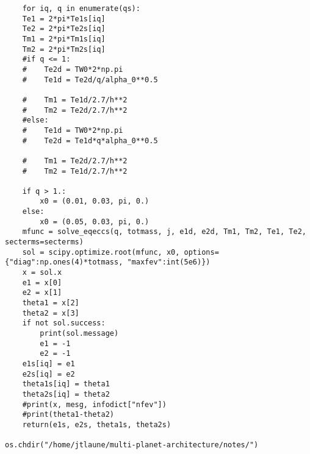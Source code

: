 \documentclass[11pt]{article}
\begin{document}
\begin{verbatim}
    for iq, q in enumerate(qs):
	Te1 = 2*pi*Te1s[iq]
	Te2 = 2*pi*Te2s[iq]
	Tm1 = 2*pi*Tm1s[iq]
	Tm2 = 2*pi*Tm2s[iq]
	#if q <= 1:
	#    Te2d = TW0*2*np.pi
	#    Te1d = Te2d/q/alpha_0**0.5

	#    Tm1 = Te1d/2.7/h**2
	#    Tm2 = Te2d/2.7/h**2
	#else:
	#    Te1d = TW0*2*np.pi
	#    Te2d = Te1d*q*alpha_0**0.5

	#    Tm1 = Te2d/2.7/h**2
	#    Tm2 = Te1d/2.7/h**2

	if q > 1.:
	    x0 = (0.01, 0.03, pi, 0.)
	else:
	    x0 = (0.05, 0.03, pi, 0.)
	mfunc = solve_eqeccs(q, totmass, j, e1d, e2d, Tm1, Tm2, Te1, Te2, secterms=secterms)
	sol = scipy.optimize.root(mfunc, x0, options={"diag":np.ones(4)*totmass, "maxfev":int(5e6)})
	x = sol.x
	e1 = x[0]
	e2 = x[1]
	theta1 = x[2]
	theta2 = x[3]
	if not sol.success:
	    print(sol.message)
	    e1 = -1
	    e2 = -1
	e1s[iq] = e1
	e2s[iq] = e2
	theta1s[iq] = theta1
	theta2s[iq] = theta2
	#print(x, mesg, infodict["nfev"])
	#print(theta1-theta2)
    return(e1s, e2s, theta1s, theta2s)

os.chdir("/home/jtlaune/multi-planet-architecture/notes/")
\end{verbatim}
\end{document}

